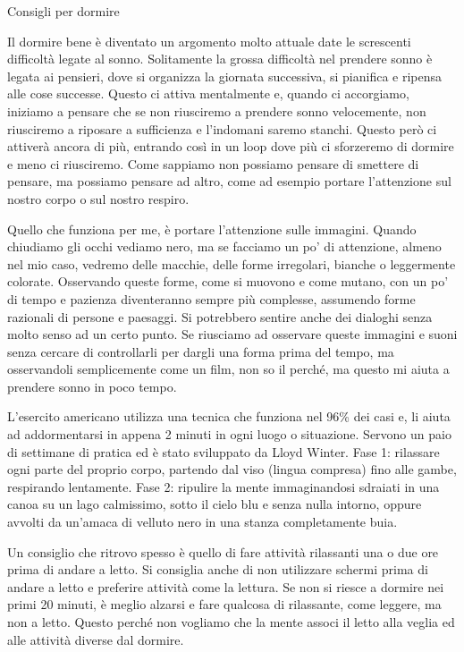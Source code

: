 \documentclass[12pt]{book} %
\begin{document}
\bigskip
\begin{mdframed}[linewidth=1pt]
Consigli per dormire

Il dormire bene è diventato un argomento molto attuale date le screscenti difficoltà legate al
sonno. Solitamente la grossa difficoltà nel prendere sonno è legata ai pensieri, dove si
organizza la giornata successiva, si pianifica e ripensa alle cose successe. Questo ci attiva mentalmente e,
quando ci accorgiamo, iniziamo a pensare che se non riusciremo a prendere sonno velocemente, non riusciremo a riposare
a sufficienza e l'indomani saremo stanchi. Questo però ci attiverà ancora di più, entrando così in
un loop dove più ci sforzeremo di dormire e meno ci riusciremo. Come sappiamo non possiamo pensare di smettere di
pensare, ma possiamo pensare ad altro, come ad esempio portare l'attenzione sul nostro corpo o sul
nostro respiro. 

Quello che funziona per me, è portare l'attenzione sulle immagini. Quando chiudiamo gli occhi vediamo nero, ma se
facciamo un po' di attenzione, almeno nel mio caso, vedremo delle macchie, delle forme irregolari, bianche o
leggermente colorate. Osservando queste forme, come si muovono e come mutano, con un po' di tempo
e pazienza diventeranno sempre più complesse, assumendo forme razionali di persone e paesaggi. Si potrebbero sentire anche
dei dialoghi senza molto senso ad un certo punto. Se riusciamo ad osservare queste immagini e suoni senza cercare di
controllarli per dargli una forma prima del tempo, ma osservandoli semplicemente come un film, non so il perché, ma
questo mi aiuta a prendere sonno in poco tempo.

L'esercito americano utilizza una tecnica che funziona nel 96\% dei casi e, li aiuta ad
addormentarsi in appena 2 minuti in ogni luogo o situazione. Servono un paio di settimane di pratica ed è stato
sviluppato da Lloyd Winter. Fase 1: rilassare ogni parte del proprio corpo, partendo
dal viso (lingua compresa) fino alle gambe, respirando lentamente. Fase 2: ripulire la mente immaginandosi sdraiati in
una canoa su un lago calmissimo, sotto il cielo blu e senza nulla intorno, oppure avvolti da un'amaca di velluto nero
in una stanza completamente buia.

Un consiglio che ritrovo spesso è quello di
fare attività rilassanti una o due ore prima di andare a letto. Si consiglia anche di non utilizzare schermi prima
di andare a letto e preferire attività come la lettura. Se non si riesce a dormire nei primi 20 minuti, è meglio
alzarsi e fare qualcosa di rilassante, come leggere, ma non a letto. Questo perché non vogliamo che la mente associ il
letto alla veglia ed alle attività diverse dal dormire. 


\end{mdframed}
\end{document}

